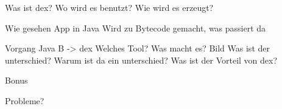 Was ist dex?
Wo wird es benutzt?
Wie wird es erzeugt?

Wie gesehen App in Java
Wird zu Bytecode gemacht, was passiert da

Vorgang Java B -> dex
Welches Tool?
Was macht es? Bild
Was ist der unterschied? Warum ist da ein unterschied?
Was ist der Vorteil von dex?

Bonus

Probleme?








%

%


